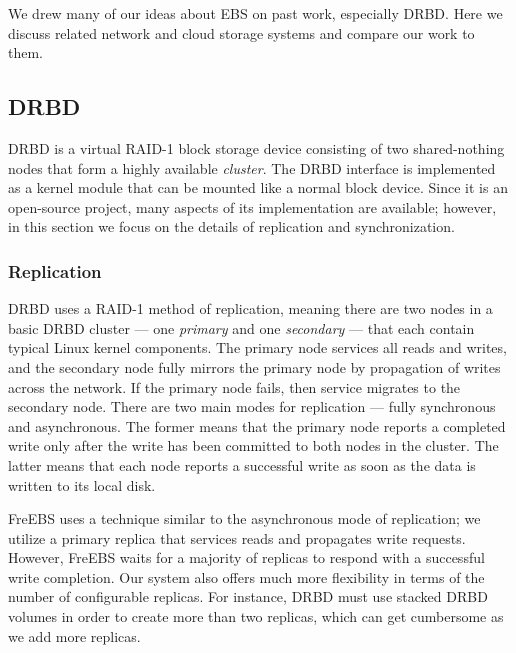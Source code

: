 We drew many of our ideas about EBS on past 
work, especially DRBD\textsuperscript{\textregistered}. Here we 
discuss related network and cloud storage systems and compare our work to them.

\subsection{DRBD}
\label{sec:drbd}
DRBD\textsuperscript{\textregistered} is a virtual RAID-1 block storage 
device consisting of two shared-nothing nodes that form a highly available
\emph{cluster}. The DRBD\textsuperscript{\textregistered} interface is 
implemented as a kernel module that can be mounted like a normal block 
device. Since it is an open-source project, many aspects of its 
implementation are available; however, in this section we focus on the
details of replication and synchronization.

\subsubsection{Replication}
DRBD\textsuperscript{\textregistered} uses a RAID-1 method of replication, 
meaning there are two nodes in a basic DRBD\textsuperscript{\textregistered} 
cluster --- one \emph{primary} and one \emph{secondary} --- that each
contain typical Linux kernel components\cite{drbd, drbd_manual}. The 
primary node 
services all reads and writes, and the secondary node fully mirrors the 
primary node by propagation of writes across the network. If the primary 
node fails, then service migrates to the secondary node. There are two 
main modes for replication --- fully synchronous and asynchronous. 
The former means that the primary node reports a completed write only after 
the write has been committed to both nodes in the cluster. The latter means 
that each node reports a successful write as soon as the data is written to 
its local disk. 

FreEBS uses a technique similar to the asynchronous mode of replication;
we utilize a primary replica that services reads and propagates write 
requests. However, FreEBS waits for a majority of replicas to respond with a
successful write completion. Our system also offers much more flexibility in 
terms of the number of configurable replicas. For instance, 
DRBD\textsuperscript{\textregistered} must use 
stacked DRBD volumes in order to create more than two replicas, which can 
get cumbersome as we add more replicas.

